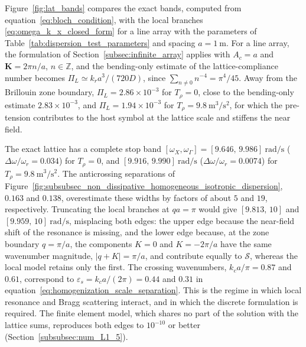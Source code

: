 Figure~\ref{fig:lat_bands} compares the exact bands, computed from equation~\eqref{eq:bloch_condition}, with the local branches \eqref{eq:omega_k_x_closed_form} for a line array with the parameters of Table~\ref{tab:dispersion_test_parameters} and spacing $a=1~\si{\meter}$. For a line array, the formulation of Section~\ref{subsec:infinite_array} applies with $A_c=a$ and $\mathbf{K}=2\pi n/a$, $n\in\mathbb{Z}$, and the bending-only estimate of the lattice-compliance number becomes $\Pi_L\simeq k_ra^3/(720D)$, since $\sum_{n\neq0}n^{-4}=\pi^4/45$. Away from the Brillouin zone boundary, $\Pi_L=2.86\times10^{-3}$ for $T_\rho=0$, close to the bending-only estimate $2.83\times10^{-3}$, and $\Pi_L=1.94\times10^{-3}$ for $T_\rho=9.8~\si{\meter\cubed\per\second\squared}$, for which the pre-tension contributes to the host symbol at the lattice scale and stiffens the near field.

The exact lattice has a complete stop band $[\omega_X,\omega_\Gamma]=[9.646,\,9.986]~\si{\radian\per\second}$ ($\Delta\omega/\omega_r=0.034$) for $T_\rho=0$, and $[9.916,\,9.990]~\si{\radian\per\second}$ ($\Delta\omega/\omega_r=0.0074$) for $T_\rho=9.8~\si{\meter\cubed\per\second\squared}$. The anticrossing separations of Figure~\ref{fig:subsubsec_non_dissipative_homogeneous_isotropic_dispersion}, $0.163$ and $0.138$, overestimate these widths by factors of about $5$ and $19$, respectively. Truncating the local branches at $qa=\pi$ would give $[9.813,\,10]$ and $[9.959,\,10]~\si{\radian\per\second}$, misplacing both edges: the upper edge because the near-field shift of the resonance is missing, and the lower edge because, at the zone boundary $q=\pi/a$, the components $K=0$ and $K=-2\pi/a$ have the same wavenumber magnitude, $|q+K|=\pi/a$, and contribute equally to $\mathcal{S}$, whereas the local model retains only the first. The crossing wavenumbers, $k_ca/\pi=0.87$ and $0.61$, correspond to $\varepsilon_s=k_ca/(2\pi)=0.44$ and $0.31$ in equation~\eqref{eq:homogenization_scale_separation}. This is the regime in which local resonance and Bragg scattering interact, and in which the discrete formulation is required. {\color{red}The finite element model, which shares no part of the solution with the lattice sums, reproduces both edges to $10^{-10}$ or better (Section~\ref{subsubsec:num_L1_5}).}

